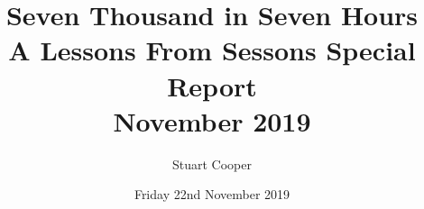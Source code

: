 \documentclass[openany]{book}
\begin{document}
\title{Seven Thousand in Seven Hours\\
  A Lessons From Sessons Special Report\\
  November 2019
}
\author{Stuart Cooper}
\date{Friday 22nd November 2019}


\maketitle




% 
\end{document}
